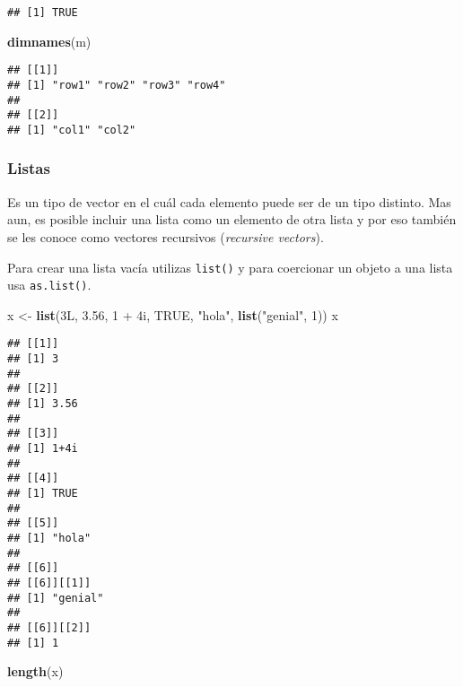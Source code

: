 \documentclass[]{article}
\newenvironment{Shaded}{\begin{snugshade}}{\end{snugshade}}
\newcommand{\KeywordTok}[1]{\textcolor[rgb]{0.13,0.29,0.53}{\textbf{{#1}}}}
\newcommand{\DecValTok}[1]{\textcolor[rgb]{0.00,0.00,0.81}{{#1}}}
\newcommand{\FloatTok}[1]{\textcolor[rgb]{0.00,0.00,0.81}{{#1}}}
\newcommand{\StringTok}[1]{\textcolor[rgb]{0.31,0.60,0.02}{{#1}}}
\newcommand{\OtherTok}[1]{\textcolor[rgb]{0.56,0.35,0.01}{{#1}}}
\newcommand{\NormalTok}[1]{{#1}}
\begin{document}
\begin{verbatim}
## [1] TRUE
\end{verbatim}

\begin{Shaded}
\begin{Highlighting}[]
\KeywordTok{dimnames}\NormalTok{(m)}
\end{Highlighting}
\end{Shaded}

\begin{verbatim}
## [[1]]
## [1] "row1" "row2" "row3" "row4"
## 
## [[2]]
## [1] "col1" "col2"
\end{verbatim}

\subsubsection{Listas}\label{listas}

Es un tipo de vector en el cuál cada elemento puede ser de un tipo
distinto. Mas aun, es posible incluir una lista como un elemento de otra
lista y por eso también se les conoce como vectores recursivos
(\emph{recursive vectors}).

Para crear una lista vacía utilizas \texttt{list()} y para coercionar un
objeto a una lista usa \texttt{as.list()}.

\begin{Shaded}
\begin{Highlighting}[]
\NormalTok{x <-}\StringTok{ }\KeywordTok{list}\NormalTok{(3L, }\FloatTok{3.56}\NormalTok{, }\DecValTok{1} \NormalTok{+}\StringTok{ }\NormalTok{4i, }\OtherTok{TRUE}\NormalTok{, }\StringTok{"hola"}\NormalTok{, }\KeywordTok{list}\NormalTok{(}\StringTok{"genial"}\NormalTok{, }\DecValTok{1}\NormalTok{))}
\NormalTok{x}
\end{Highlighting}
\end{Shaded}

\begin{verbatim}
## [[1]]
## [1] 3
## 
## [[2]]
## [1] 3.56
## 
## [[3]]
## [1] 1+4i
## 
## [[4]]
## [1] TRUE
## 
## [[5]]
## [1] "hola"
## 
## [[6]]
## [[6]][[1]]
## [1] "genial"
## 
## [[6]][[2]]
## [1] 1
\end{verbatim}

\begin{Shaded}
\begin{Highlighting}[]
\KeywordTok{length}\NormalTok{(x)}
\end{Highlighting}
\end{Shaded}
\end{document}
